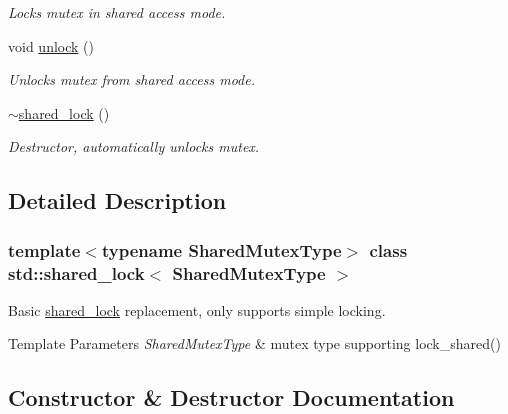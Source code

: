 \begin{DoxyCompactItemize}
\begin{DoxyCompactList}\small\item\em Locks mutex in shared access mode. \end{DoxyCompactList}\item 
\mbox{\label{classstd_1_1shared__lock_ae84b24e0f1b3c6bf8e8ff24af779450e}} 
void \hyperlink{classstd_1_1shared__lock_ae84b24e0f1b3c6bf8e8ff24af779450e}{unlock} ()
\begin{DoxyCompactList}\small\item\em Unlocks mutex from shared access mode. \end{DoxyCompactList}\item 
\mbox{\label{classstd_1_1shared__lock_a0c954081592f905fa65b0f45c4c06100}} 
\hyperlink{classstd_1_1shared__lock_a0c954081592f905fa65b0f45c4c06100}{$\sim$shared\+\_\+lock} ()
\begin{DoxyCompactList}\small\item\em Destructor, automatically unlocks mutex. \end{DoxyCompactList}\end{DoxyCompactItemize}


\subsection{Detailed Description}
\subsubsection*{template$<$typename Shared\+Mutex\+Type$>$\newline
class std\+::shared\+\_\+lock$<$ Shared\+Mutex\+Type $>$}

Basic \hyperlink{classstd_1_1shared__lock}{shared\+\_\+lock} replacement, only supports simple locking. 


\begin{DoxyTemplParams}{Template Parameters}
{\em Shared\+Mutex\+Type} & mutex type supporting lock\+\_\+shared() \\
\hline
\end{DoxyTemplParams}


\subsection{Constructor \& Destructor Documentation}
\mbox{\label{classstd_1_1shared__lock_ad98172785abb3cf717e758dfe033798e}} 
